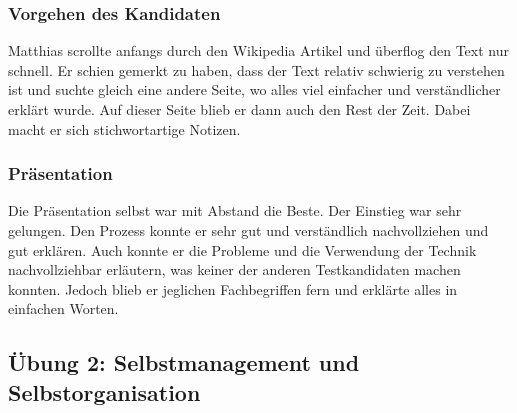 \subsubsection{Vorgehen des Kandidaten} \label{bemmat}

Matthias scrollte anfangs durch den Wikipedia Artikel und überflog den Text nur schnell. Er schien gemerkt zu haben, dass der Text relativ schwierig zu verstehen ist und suchte gleich eine andere Seite, wo alles viel einfacher und verständlicher erklärt wurde. Auf dieser Seite blieb er dann auch den Rest der Zeit. Dabei macht er sich stichwortartige Notizen.

\subsubsection{Präsentation}

Die Präsentation selbst war mit Abstand die Beste. Der Einstieg war sehr gelungen. Den Prozess konnte er sehr gut und verständlich nachvollziehen und gut erklären. Auch konnte er die Probleme und die Verwendung der Technik nachvollziehbar erläutern, was keiner der anderen Testkandidaten machen konnten. Jedoch blieb er jeglichen Fachbegriffen fern und erklärte alles in einfachen Worten. 


\subsection{Übung 2: Selbstmanagement und Selbstorganisation}
